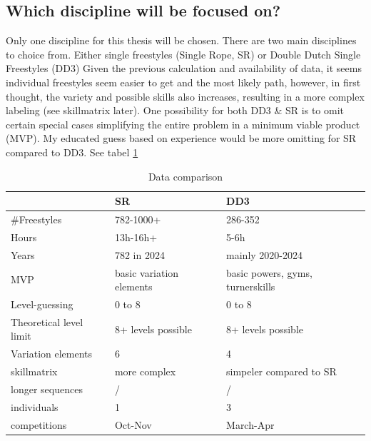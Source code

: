 
\subsection{Which discipline will be focused on?}

Only one discipline for this thesis will be chosen.
There are two main disciplines to choice from. Either single freestyles (Single Rope, SR) or Double Dutch Single Freestyles (DD3)
Given the previous calculation and availability of data, it seems individual freestyles seem easier to get and the most likely path, however, in first thought, the variety and possible skills also increases, resulting in a more complex labeling (see skillmatrix later). One possibility for both DD3 \& SR is to omit certain special cases simplifying the entire problem in a minimum viable product (MVP). My educated guess based on experience would be more omitting for SR compared to DD3. See tabel \ref{tbl:data-comparison}

\begin{table}[t]
    \centering
    \begin{tabular}{|l|l|l|}
        \hline
          & SR & DD3 \\ \hline
        \#Freestyles & 782-1000+ & 286-352 \\ \hline
        Hours & 13h-16h+ & 5-6h \\ \hline
        Years & 782 in 2024 & mainly 2020-2024 \\ \hline
        MVP & basic variation elements & basic powers, gyms, turnerskills \\ \hline
        Level-guessing & 0 to 8 & 0 to 8 \\ \hline
        Theoretical level limit & 8+ levels possible & 8+ levels possible \\ \hline
        Variation elements & 6 & 4 \\ \hline
        skillmatrix & more complex & simpeler compared to SR \\ \hline
        longer sequences & / & / \\ \hline
        individuals & 1 & 3 \\ \hline
        competitions & Oct-Nov & March-Apr \\ \hline
    \end{tabular}
    \caption{Data comparison}
    \label{tbl:data-comparison}
\end{table}

